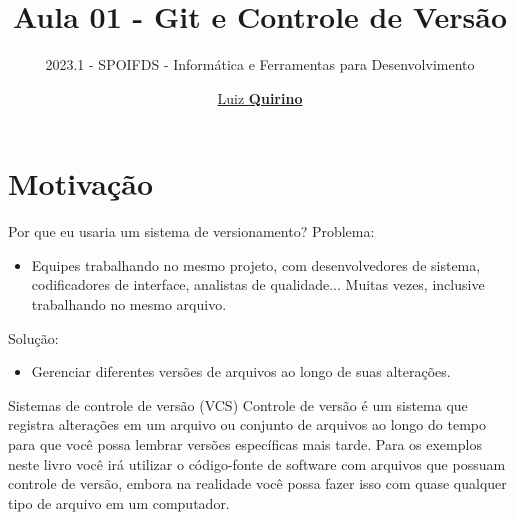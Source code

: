 \documentclass{beamer}
\title{Aula 01 - Git e Controle de Versão}
\subtitle{2023.1 - SPOIFDS - Informática e Ferramentas para Desenvolvimento }
\author{\href{mailto:luizfpq@gmail.com}{Luiz \textbf{Quirino}}}
\newcommand{\hrefcol}[2]{\textcolor{cyan}{\href{#1}{#2}}}
\begin{document}
\maketitle

%
%




\section{Motivação}

\begin{frame}{Por que eu usaria um sistema de versionamento?}
Problema:
\begin{itemize}
      \item Equipes trabalhando no mesmo projeto, com desenvolvedores de sistema, codificadores de interface, analistas de qualidade... Muitas vezes, inclusive trabalhando no mesmo arquivo.
\end{itemize}
Solução:
\begin{itemize}
      \item Gerenciar diferentes versões de arquivos ao longo de suas alterações.
\end{itemize}
\end{frame}

\begin{frame}{Sistemas de controle de versão (VCS)}\justifying
      Controle de versão é um sistema que registra alterações em um arquivo ou conjunto de arquivos ao longo do tempo para que você possa lembrar versões específicas mais tarde. Para os exemplos neste livro você irá utilizar o código-fonte de software com arquivos que possuam controle de versão, embora na realidade você possa fazer isso com quase qualquer tipo de arquivo em um computador.
\end{frame}
\end{document}
